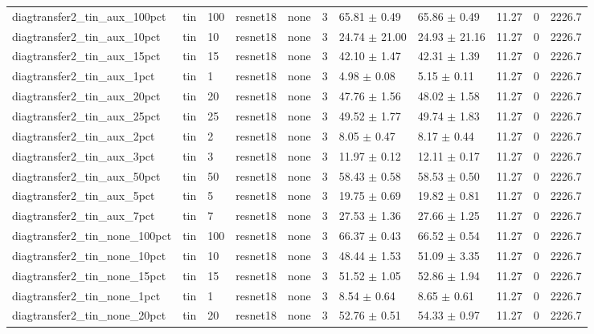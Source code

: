 \begin{tabular}{lllllllllll}
diagtransfer2_tin_aux_100pct & tin & 100 & resnet18 & none & 3 & 65.81 $\pm$ 0.49 & 65.86 $\pm$ 0.49 & 11.27 & 0 & 2226.7 \\
diagtransfer2_tin_aux_10pct & tin & 10 & resnet18 & none & 3 & 24.74 $\pm$ 21.00 & 24.93 $\pm$ 21.16 & 11.27 & 0 & 2226.7 \\
diagtransfer2_tin_aux_15pct & tin & 15 & resnet18 & none & 3 & 42.10 $\pm$ 1.47 & 42.31 $\pm$ 1.39 & 11.27 & 0 & 2226.7 \\
diagtransfer2_tin_aux_1pct & tin & 1 & resnet18 & none & 3 & 4.98 $\pm$ 0.08 & 5.15 $\pm$ 0.11 & 11.27 & 0 & 2226.7 \\
diagtransfer2_tin_aux_20pct & tin & 20 & resnet18 & none & 3 & 47.76 $\pm$ 1.56 & 48.02 $\pm$ 1.58 & 11.27 & 0 & 2226.7 \\
diagtransfer2_tin_aux_25pct & tin & 25 & resnet18 & none & 3 & 49.52 $\pm$ 1.77 & 49.74 $\pm$ 1.83 & 11.27 & 0 & 2226.7 \\
diagtransfer2_tin_aux_2pct & tin & 2 & resnet18 & none & 3 & 8.05 $\pm$ 0.47 & 8.17 $\pm$ 0.44 & 11.27 & 0 & 2226.7 \\
diagtransfer2_tin_aux_3pct & tin & 3 & resnet18 & none & 3 & 11.97 $\pm$ 0.12 & 12.11 $\pm$ 0.17 & 11.27 & 0 & 2226.7 \\
diagtransfer2_tin_aux_50pct & tin & 50 & resnet18 & none & 3 & 58.43 $\pm$ 0.58 & 58.53 $\pm$ 0.50 & 11.27 & 0 & 2226.7 \\
diagtransfer2_tin_aux_5pct & tin & 5 & resnet18 & none & 3 & 19.75 $\pm$ 0.69 & 19.82 $\pm$ 0.81 & 11.27 & 0 & 2226.7 \\
diagtransfer2_tin_aux_7pct & tin & 7 & resnet18 & none & 3 & 27.53 $\pm$ 1.36 & 27.66 $\pm$ 1.25 & 11.27 & 0 & 2226.7 \\
diagtransfer2_tin_none_100pct & tin & 100 & resnet18 & none & 3 & 66.37 $\pm$ 0.43 & 66.52 $\pm$ 0.54 & 11.27 & 0 & 2226.7 \\
diagtransfer2_tin_none_10pct & tin & 10 & resnet18 & none & 3 & 48.44 $\pm$ 1.53 & 51.09 $\pm$ 3.35 & 11.27 & 0 & 2226.7 \\
diagtransfer2_tin_none_15pct & tin & 15 & resnet18 & none & 3 & 51.52 $\pm$ 1.05 & 52.86 $\pm$ 1.94 & 11.27 & 0 & 2226.7 \\
diagtransfer2_tin_none_1pct & tin & 1 & resnet18 & none & 3 & 8.54 $\pm$ 0.64 & 8.65 $\pm$ 0.61 & 11.27 & 0 & 2226.7 \\
diagtransfer2_tin_none_20pct & tin & 20 & resnet18 & none & 3 & 52.76 $\pm$ 0.51 & 54.33 $\pm$ 0.97 & 11.27 & 0 & 2226.7 \\

\end{tabular}
